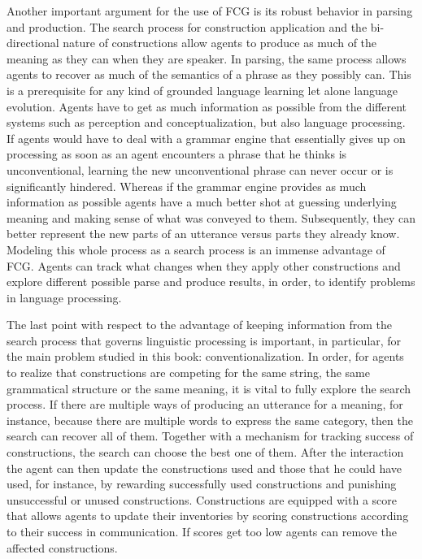 Another important argument for the use of FCG is its robust
behavior in parsing and production. The search process
for construction application and the bi-directional 
nature of constructions allow agents to produce
as much of the meaning as they can when they
are speaker. In parsing, the same process
allows agents to  recover as much of the semantics 
of a phrase as they possibly can. This is a prerequisite 
for any kind of grounded language learning let alone
language evolution. Agents have to get as much
information as possible from the different systems
such as perception and conceptualization, but also
language processing. If agents would have to deal with
a grammar engine that essentially gives up on processing
as soon as an agent encounters a phrase that he
thinks is unconventional, learning the new unconventional
phrase can never occur or is significantly hindered. Whereas
if the grammar engine provides as much information as 
possible agents have a much better shot at guessing
underlying meaning and making sense
of what was conveyed to them. Subsequently,
they can better represent the new parts of an 
utterance versus parts they already know.
Modeling this whole process as a search
process is an immense advantage of FCG.
Agents can track what changes when they
apply other constructions and explore different
possible parse and produce results, in order,
to identify problems in language processing.

The last point with respect to the advantage of
keeping information from the search process that
governs linguistic processing is important, in particular,
for the main problem studied in this book: conventionalization.
In order, for agents to realize that constructions are competing
for the same string, the same grammatical structure or
the same meaning, it is vital to fully explore the search process.
If there are multiple ways of producing an utterance for a meaning,
for instance, because there are multiple words to express
the same category, then the search can recover 
all of them. Together with a mechanism for tracking
success of constructions, the search can choose
the best one of them. After the interaction the agent can
then update the constructions used and those that
he could have used, for instance, by rewarding
successfully used constructions and punishing 
unsuccessful or unused constructions.
Constructions are equipped with a score that
allows agents to update their inventories
by scoring constructions according to their success
in communication. If scores get too low agents can remove
the affected constructions.

